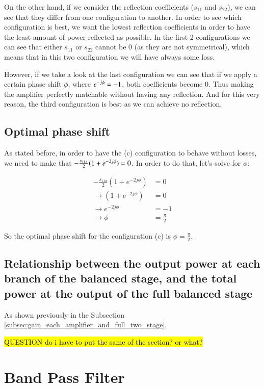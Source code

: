 \documentclass[12pt]{report} %
\newcommand{\question}[1]{\sethlcolor{red}\hl{QUESTION #1}}
\begin{document}
On the other hand, if we consider the reflection coefficients ($s_{11}$ and $s_{22}$), we can see that they differ from one configuration to another. In order to see which configuration is best, we want the lowest reflection coefficients in order to have the least amount of power reflected as possible. In the first 2 configurations we can see that either $s_{11}$ or $s_{22}$ cannot be 0 (as they are not symmetrical), which means that in this two configuration we will have always some loss.

However, if we take a look at the last configuration we can see that if we apply a certain phase shift $\phi$, where $e^{- j \* \phi} = -1$, both coefficients become 0. Thus making the amplifier perfectly matchable without having any reflection. And for this very reason, the third configuration is best as we can achieve no reflection.

\subsection{Optimal phase shift}

As stated before, in order to have the (c) configuration to behave without losses, we need to make that $- \frac{s_{11A}}{2} \* (1 + e^{-2 \* j \* \phi}) = 0$. In order to do that, let's solve for $\phi$:

\begin{align*}
- \frac{s_{11a}}{2} (1 + e^{-2j\phi}) &= 0 \\
\rightarrow (1 + e^{-2j\phi}) &= 0 \\
\rightarrow e^{-2j\phi} &= -1 \\
\rightarrow \phi &= \frac{\pi}{2}
\end{align*}

So the optimal phase shift for the configuration (c) is $\phi = \frac{\pi}{2}$.

\subsection{Relationship between the output power at each branch of the balanced stage, and the total power at the output of the full balanced stage}

As shown previously in the Subsection \ref{subsec:gain_each_amplifier_and_full_two_stage},

\question{do i have to put the same of the section? or what?}

\section{Band Pass Filter}
\end{document}
